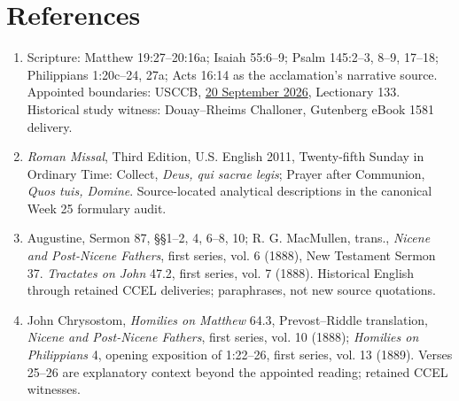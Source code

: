 \section*{References}
\begin{enumerate}[leftmargin=1.6em,itemsep=0.3em,parsep=0pt]
\item Scripture: Matthew 19:27--20:16a; Isaiah 55:6--9; Psalm 145:2--3, 8--9, 17--18; Philippians 1:20c--24, 27a; Acts 16:14 as the acclamation's narrative source. Appointed boundaries: USCCB, \href{https://bible.usccb.org/bible/readings/092026.cfm}{20 September 2026}, Lectionary 133. Historical study witness: Douay--Rheims Challoner, Gutenberg eBook 1581 delivery.
\item \textit{Roman Missal}, Third Edition, U.S. English 2011, Twenty-fifth Sunday in Ordinary Time: Collect, \textit{Deus, qui sacrae legis}; Prayer after Communion, \textit{Quos tuis, Domine}. Source-located analytical descriptions in the canonical Week 25 formulary audit.
\item Augustine, Sermon 87, §§1--2, 4, 6--8, 10; R. G. MacMullen, trans., \textit{Nicene and Post-Nicene Fathers}, first series, vol. 6 (1888), New Testament Sermon 37. \textit{Tractates on John} 47.2, first series, vol. 7 (1888). Historical English through retained CCEL deliveries; paraphrases, not new source quotations.
\item John Chrysostom, \textit{Homilies on Matthew} 64.3, Prevost--Riddle translation, \textit{Nicene and Post-Nicene Fathers}, first series, vol. 10 (1888); \textit{Homilies on Philippians} 4, opening exposition of 1:22--26, first series, vol. 13 (1889). Verses 25--26 are explanatory context beyond the appointed reading; retained CCEL witnesses.
\end{enumerate}

